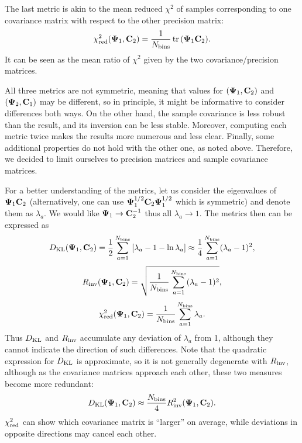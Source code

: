 The last metric is akin to the mean reduced $\chi^2$ of samples corresponding to one covariance matrix with respect to the other precision matrix:
\begin{equation} \label{eq:chi2_red-definition}
\chi^2_{\rm red} \Arg{{\bf \Psi}_1, {\bf C}_2} = \frac1{N_{\rm bins}} \tr \Arg{{\bf \Psi}_1 {\bf C}_2}.
\end{equation}
It can be seen as the mean ratio of $\chi^2$ given by the two covariance/precision matrices.

All three metrics are not symmetric, meaning that values for ${\left( {\bf \Psi}_1, {\bf C}_2 \right)}$ and ${\left( {\bf \Psi}_2, {\bf C}_1 \right)}$ may be different, so in principle, it might be informative to consider differences both ways.
On the other hand, the sample covariance is less robust than the \rascalc{} result, and its inversion can be less stable.
Moreover, computing each metric twice makes the results more numerous and less clear.
Finally, some additional properties do not hold with the other one, as noted above.
Therefore, we decided to limit ourselves to \rascalc{} precision matrices and sample covariance matrices.

For a better understanding of the metrics, let us consider the eigenvalues of ${\bf \Psi}_1 {\bf C}_2$ (alternatively, one can use ${\bf \Psi}_1^{1/2} {\bf C}_2 {\bf \Psi}_1^{1/2}$ which is symmetric) and denote them as $\lambda_a$.
We would like ${\bf \Psi}_1 \rightarrow {\bf C}_2^{-1}$ thus all $\lambda_a \rightarrow 1$.
The metrics then can be expressed as
\begin{equation} \label{eq:D_KL-explanation}
D_{\rm KL} {\left( {\bf \Psi}_1, {\bf C}_2 \right)} = \frac12 \sum_{a=1}^{N_{\rm bins}} \left[ \lambda_a - 1 - \ln \lambda_a \right] \approx \frac14 \sum_{a=1}^{N_{\rm bins}} (\lambda_a - 1)^2,
\end{equation}
\begin{equation} \label{eq:R_inv-explanation}
R_{\rm inv} {\left( {\bf \Psi}_1, {\bf C}_2 \right)} = \sqrt{\frac1{N_{\rm bins}} \sum_{a=1}^{N_{\rm bins}} (\lambda_a - 1)^2},
\end{equation}
\begin{equation} \label{eq:chi2_red-explanation}
\chi^2_{\rm red} {\left( {\bf \Psi}_1, {\bf C}_2 \right)} = \frac1{N_{\rm bins}} \sum_{a=1}^{N_{\rm bins}} \lambda_a.
\end{equation}
Thus $D_{\rm KL}$ and $R_{\rm inv}$ accumulate any deviation of $\lambda_a$ from 1, although they cannot indicate the direction of such differences.
Note that the quadratic expression for $D_{\rm KL}$ is approximate, so it is not generally degenerate with $R_{\rm inv}$, although as the covariance matrices approach each other, these two measures become more redundant:
\begin{equation} \label{eq:D_KL-R_inv-redundancy}
D_{\rm KL} {\left( {\bf \Psi}_1, {\bf C}_2 \right)} \approx \frac{N_{\rm bins}}4 R_{\rm inv}^2 {\left( {\bf \Psi}_1, {\bf C}_2 \right)}.
\end{equation}
$\chi^2_{\rm red}$ can show which covariance matrix is ``larger'' on average, while deviations in opposite directions may cancel each other.


